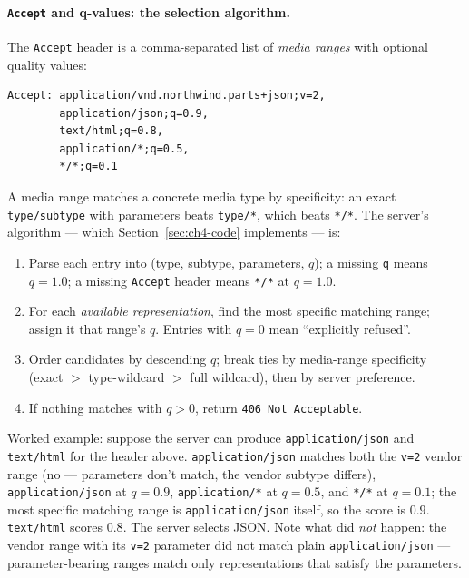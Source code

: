 \paragraph{\texttt{Accept} and q-values: the selection algorithm.}
The \texttt{Accept} header is a comma-separated list of \emph{media ranges} with
optional quality values:

\begin{verbatim}
Accept: application/vnd.northwind.parts+json;v=2,
        application/json;q=0.9,
        text/html;q=0.8,
        application/*;q=0.5,
        */*;q=0.1
\end{verbatim}

A media range matches a concrete media type by specificity: an exact
\texttt{type/subtype} with parameters beats \texttt{type/*}, which beats
\texttt{*/*}. The server's algorithm --- which Section~\ref{sec:ch4-code} implements
--- is:

\begin{enumerate}
  \item Parse each entry into (type, subtype, parameters, $q$); a missing
        \texttt{q} means $q = 1.0$; a missing \texttt{Accept} header means
        \texttt{*/*} at $q = 1.0$.
  \item For each \emph{available representation}, find the most specific matching
        range; assign it that range's $q$. Entries with $q = 0$ mean ``explicitly
        refused''.
  \item Order candidates by descending $q$; break ties by media-range specificity
        (exact $>$ type-wildcard $>$ full wildcard), then by server preference.
  \item If nothing matches with $q > 0$, return \texttt{406 Not Acceptable}.
\end{enumerate}

Worked example: suppose the server can produce \texttt{application/json} and
\texttt{text/html} for the header above. \texttt{application/json} matches both the
\texttt{v=2} vendor range (no --- parameters don't match, the vendor subtype
differs), \texttt{application/json} at $q{=}0.9$, \texttt{application/*} at
$q{=}0.5$, and \texttt{*/*} at $q{=}0.1$; the most specific matching range is
\texttt{application/json} itself, so the score is $0.9$. \texttt{text/html} scores
$0.8$. The server selects JSON. Note what did \emph{not} happen: the vendor range
with its \texttt{v=2} parameter did not match plain \texttt{application/json} ---
parameter-bearing ranges match only representations that satisfy the parameters.

